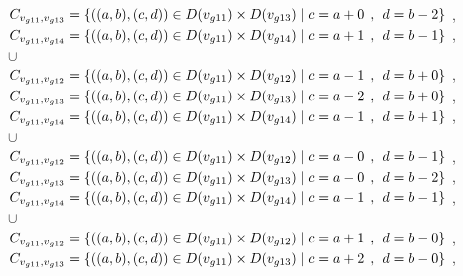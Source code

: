 \\$C_{v_{g11},v_{g13}}=\{((a,b),(c,d))\in D(v_{g11}) \times D(v_{g13})\mid c = a + 0\hspace{1ex} , \hspace{1ex}  d = b - 2 \}$ , 
\\$C_{v_{g11},v_{g14}}=\{((a,b),(c,d))\in D(v_{g11}) \times D(v_{g14})\mid c = a + 1\hspace{1ex} , \hspace{1ex}  d = b - 1 \}$ , 
\\$\cup$
\\$C_{v_{g11},v_{g12}}=\{((a,b),(c,d))\in D(v_{g11}) \times D(v_{g12})\mid c = a - 1\hspace{1ex} , \hspace{1ex}  d = b + 0 \}$ , 
\\$C_{v_{g11},v_{g13}}=\{((a,b),(c,d))\in D(v_{g11}) \times D(v_{g13})\mid c = a - 2\hspace{1ex} , \hspace{1ex}  d = b + 0 \}$ , 
\\$C_{v_{g11},v_{g14}}=\{((a,b),(c,d))\in D(v_{g11}) \times D(v_{g14})\mid c = a - 1\hspace{1ex} , \hspace{1ex}  d = b + 1 \}$ , 
\\$\cup$
\\$C_{v_{g11},v_{g12}}=\{((a,b),(c,d))\in D(v_{g11}) \times D(v_{g12})\mid c = a - 0\hspace{1ex} , \hspace{1ex}  d = b - 1 \}$ , 
\\$C_{v_{g11},v_{g13}}=\{((a,b),(c,d))\in D(v_{g11}) \times D(v_{g13})\mid c = a - 0\hspace{1ex} , \hspace{1ex}  d = b - 2 \}$ , 
\\$C_{v_{g11},v_{g14}}=\{((a,b),(c,d))\in D(v_{g11}) \times D(v_{g14})\mid c = a - 1\hspace{1ex} , \hspace{1ex}  d = b - 1 \}$ , 
\\$\cup$
\\$C_{v_{g11},v_{g12}}=\{((a,b),(c,d))\in D(v_{g11}) \times D(v_{g12})\mid c = a + 1\hspace{1ex} , \hspace{1ex}  d = b - 0 \}$ , 
\\$C_{v_{g11},v_{g13}}=\{((a,b),(c,d))\in D(v_{g11}) \times D(v_{g13})\mid c = a + 2\hspace{1ex} , \hspace{1ex}  d = b - 0 \}$ , 
